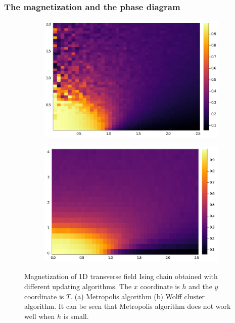 \documentclass[hyperref, a4paper]{article}
\begin{document}
\subsubsection{The magnetization and the phase diagram}

\begin{figure}
    \centering
    \begin{subfigure}{0.45\textwidth}
        \centering
        \includegraphics[width=\textwidth]{phase/phase-diagram-transverse-ising-metropolis.PNG}
        \subcaption{}
    \end{subfigure}
    \begin{subfigure}{0.45\textwidth}
        \centering
        \includegraphics[width=\textwidth]{phase/phase-diagram-transverse-ising-wolff.PNG}
        \subcaption{}
    \end{subfigure}
    \caption{Magnetization of 1D transverse field Ising chain obtained with different updating algorithms. The $x$ coordinate is $h$ and the $y$ coordinate is $T$. (a) Metropolis algorithm (b) Wolff cluster algorithm. 
    It can be seen that Metropolis algorithm does not work well when $h$ is small.}
    \label{fig:comparision-metropolis-wolff}
\end{figure}
\end{document}
